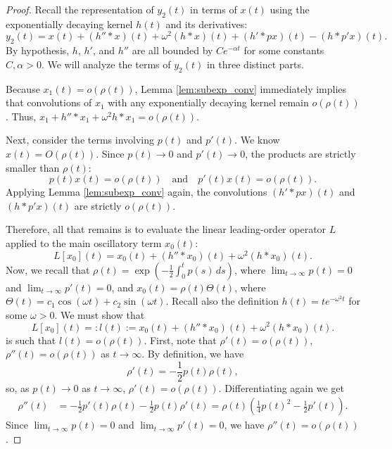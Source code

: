 \documentclass[10pt,reqno]{amsart}
\theoremstyle{definition}
\begin{document}
	\begin{proof}
		Recall the representation of $y_2(t)$ in terms of $x(t)$ using the exponentially decaying kernel $h(t)$ and its derivatives:
		\[ y_2(t) = x(t) + (h'' * x)(t) + \omega^2(h * x)(t) + (h' * px)(t) - (h * p'x)(t). \]
		By hypothesis, $h$, $h'$, and $h''$ are all bounded by $C e^{-\alpha t}$ for some constants $C, \alpha > 0$. We will analyze the terms of $y_2(t)$ in three distinct parts.
		
		Because $x_1(t) = o(\rho(t))$, Lemma \ref{lem:subexp_conv} immediately implies that convolutions of $x_1$ with any exponentially decaying kernel remain $o(\rho(t))$. Thus, $x_1 + h'' * x_1 + \omega^2 h * x_1 = o(\rho(t))$.
		
		Next, consider the terms involving $p(t)$ and $p'(t)$. We know $x(t) = O(\rho(t))$. Since $p(t) \to 0$ and $p'(t) \to 0$, the products are strictly smaller than $\rho(t)$:
		\[ p(t)x(t) = o(\rho(t)) \quad \text{and} \quad p'(t)x(t) = o(\rho(t)). \]
		Applying Lemma \ref{lem:subexp_conv} again, the convolutions $(h' * px)(t)$ and $(h * p'x)(t)$ are strictly $o(\rho(t))$. 
		
		Therefore, all that remains is to evaluate the linear leading-order operator $L$ applied to the main oscillatory term $x_0(t)$:
		\[ L[x_0](t) = x_0(t) + (h'' * x_0)(t) + \omega^2 (h * x_0)(t). \]	
		Now, we recall that  $\rho(t) = \exp\left(-\frac{1}{2}\int_0^t p(s)\,ds\right)$, where $\lim_{t \to \infty} p(t) = 0$ and $\lim_{t \to \infty} p'(t) = 0$, and  $x_0(t) = \rho(t)\Theta(t)$, where $\Theta(t) = c_1 \cos(\omega t) + c_2 \sin(\omega t)$. Recall also the definition 
	   $h(t) = t e^{-\omega^2 t}$ for some $\omega > 0$. We must show that 
\[ L[x_0](t)=: l(t) := x_0(t) + (h'' * x_0)(t) + \omega^2 (h * x_0)(t).
\]
is such that $l(t)=o(\rho(t))$. 
First, note that 			
$\rho'(t) = o(\rho(t))$, $\rho''(t) = o(\rho(t))$ as $t \to \infty$. By definition, we have 
\[ \rho'(t) = %
-\frac{1}{2}p(t)\rho(t), \]
so, as $p(t)\to 0$ as $t\to\infty$, $\rho'(t)=o(\rho(t))$. 
Differentiating again we get 	
			\begin{align*}
				\rho''(t) &= -\frac{1}{2}p'(t)\rho(t) - \frac{1}{2}p(t)\rho'(t) = \rho(t) \left( \frac{1}{4}p(t)^2 - \frac{1}{2}p'(t) \right).
			\end{align*}
			Since $\lim_{t \to \infty} p(t) = 0$ and $\lim_{t \to \infty} p'(t) = 0$, we have  $\rho''(t) = o(\rho(t))$. 
			

\end{proof}
\end{document}
